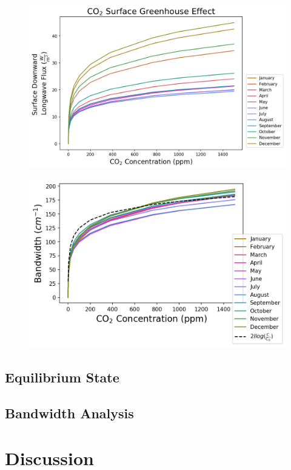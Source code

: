 \documentclass[12]{article}
\begin{document}
\begin{figure}[htb!]
\noindent\includegraphics[width=1\textwidth]{figures/sfc_CO2_effect.png}
\centering
\caption{}
\label{fig:sfc_CO2_effect}
\end{figure}

\begin{figure}[htb!]
\noindent\includegraphics[width=1\textwidth]{figures/sfc_bandwidth.png}
\centering
\caption{}
\label{fig:sfc_bandwidth}
\end{figure}




\subsection{Equilibrium State}
\subsection{Bandwidth Analysis}
\section{Discussion}



\end{document}
